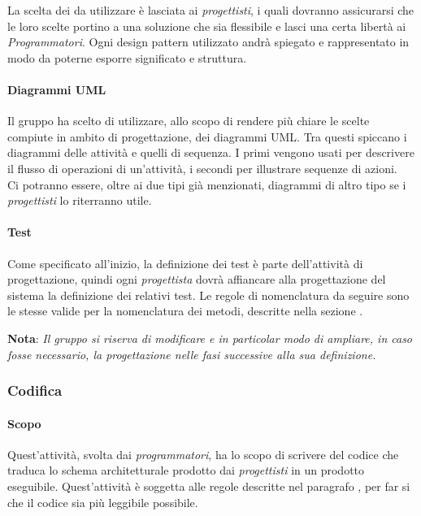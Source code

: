 La scelta dei  da utilizzare è lasciata ai \emph{progettisti}, i quali dovranno 
assicurarsi che le loro scelte portino a una soluzione che sia flessibile e lasci una certa libertà ai 
\emph{Programmatori}. Ogni design pattern utilizzato andrà spiegato e rappresentato in modo da poterne esporre 
significato e struttura.

\paragraph{Diagrammi UML}

Il gruppo ha scelto di utilizzare, allo scopo di rendere più chiare le scelte compiute in ambito di progettazione, 
dei diagrammi UML. Tra questi spiccano i diagrammi delle attività e quelli di sequenza. I primi vengono usati per 
descrivere il flusso di operazioni di un'attività, i secondi per illustrare sequenze di azioni.\\
Ci potranno essere, oltre ai due tipi già menzionati, diagrammi di altro tipo se i \emph{progettisti} lo riterranno 
utile.

\paragraph{Test}

Come specificato all'inizio, la definizione dei test è parte dell'attività di progettazione, quindi ogni 
\emph{progettista} dovrà affiancare alla progettazione del sistema la definizione dei relativi test. Le regole di 
nomenclatura da seguire sono le stesse valide per la nomenclatura dei metodi, descritte nella sezione 
.

\begin{center}
    \textbf{Nota}: \emph{Il gruppo si riserva di modificare e in particolar modo di ampliare, in caso fosse 
    necessario, la progettazione nelle fasi successive alla sua definizione.}
\end{center}

\subsubsection{Codifica}
 
\paragraph{Scopo}

Quest'attività, svolta dai \emph{programmatori}, ha lo scopo di scrivere del codice che traduca lo schema architetturale 
prodotto dai \emph{progettisti} in un prodotto eseguibile. Quest'attività è soggetta alle regole descritte nel paragrafo 
, per far si che il codice sia più leggibile possibile.

